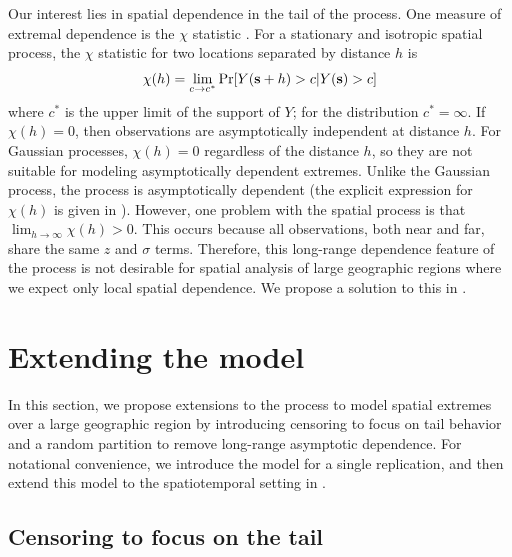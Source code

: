 Our interest lies in spatial dependence in the tail of the \skewt{} process.
One measure of extremal dependence is the $\chi$ statistic \citep{Coles1999}.
For a stationary and isotropic spatial process, the $\chi$ statistic for two locations separated by distance $h$ is
\begin{align} \label{steq:chih}
  \chi(h) = \lim_{c \rightarrow c^*} \Pr[Y(\mathbf{s} + h) > c | Y(\mathbf{s}) > c]
\end{align}
where $c^*$ is the upper limit of the support of $Y$; for the \skewt{} distribution $c^* = \infty$.
If $\chi(h) = 0$, then observations are asymptotically independent at distance $h$.
For Gaussian processes, $\chi(h) = 0$ regardless of the distance $h$, so they are not suitable for modeling asymptotically dependent extremes.
Unlike the Gaussian process, the \skewt{} process is asymptotically dependent (the explicit expression for $\chi(h)$ is given in ).
However, one problem with the spatial \skewt{} process is that $\displaystyle \lim_{h \rightarrow \infty} \chi(h) > 0$.
This occurs because all observations, both near and far, share the same $z$ and $\sigma$ terms.
Therefore, this long-range dependence feature of the \skewt{} process is not desirable for spatial analysis of large geographic regions where we expect only local spatial dependence.
We propose a solution to this in .

\section{Extending the model}\label{sts:spatial}

In this section, we propose extensions to the \skewt{} process to model spatial extremes over a large geographic region by introducing censoring to focus on tail behavior and a random partition to remove long-range asymptotic dependence.
For notational convenience, we introduce the model for a single replication, and then extend this model to the spatiotemporal setting in .

\subsection{Censoring to focus on the tail} \label{sts:censoring}

